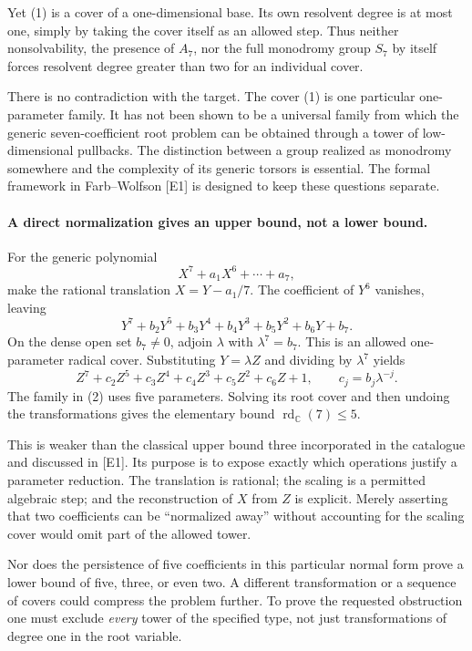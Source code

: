 \documentclass[11pt]{article}
\begin{document}
Yet (1) is a cover of a one-dimensional base. Its own resolvent degree is at most one, simply by taking the cover itself as an allowed step. Thus neither nonsolvability, the presence of $A_7$, nor the full monodromy group $S_7$ by itself forces resolvent degree greater than two for an individual cover.

There is no contradiction with the target. The cover (1) is one particular one-parameter family. It has not been shown to be a universal family from which the generic seven-coefficient root problem can be obtained through a tower of low-dimensional pullbacks. The distinction between a group realized as monodromy somewhere and the complexity of its generic torsors is essential. The formal framework in Farb--Wolfson [E1] is designed to keep these questions separate.

\paragraph{A direct normalization gives an upper bound, not a lower bound.}
For the generic polynomial
\[
 X^7+a_1X^6+\cdots+a_7,
\]
make the rational translation $X=Y-a_1/7$. The coefficient of $Y^6$ vanishes, leaving
\[
 Y^7+b_2Y^5+b_3Y^4+b_4Y^3+b_5Y^2+b_6Y+b_7.
\]
On the dense open set $b_7\ne0$, adjoin $\lambda$ with $\lambda^7=b_7$. This is an allowed one-parameter radical cover. Substituting $Y=\lambda Z$ and dividing by $\lambda^7$ yields
\[
 Z^7+c_2Z^5+c_3Z^4+c_4Z^3+c_5Z^2+c_6Z+1,
 \qquad c_j=b_j\lambda^{-j}.                              \tag{2}
\]
The family in (2) uses five parameters. Solving its root cover and then undoing the transformations gives the elementary bound $\operatorname{rd}_{\mathbb C}(7)\le5$.

This is weaker than the classical upper bound three incorporated in the catalogue and discussed in [E1]. Its purpose is to expose exactly which operations justify a parameter reduction. The translation is rational; the scaling is a permitted algebraic step; and the reconstruction of $X$ from $Z$ is explicit. Merely asserting that two coefficients can be ``normalized away'' without accounting for the scaling cover would omit part of the allowed tower.

Nor does the persistence of five coefficients in this particular normal form prove a lower bound of five, three, or even two. A different transformation or a sequence of covers could compress the problem further. To prove the requested obstruction one must exclude \emph{every} tower of the specified type, not just transformations of degree one in the root variable.
\end{document}
